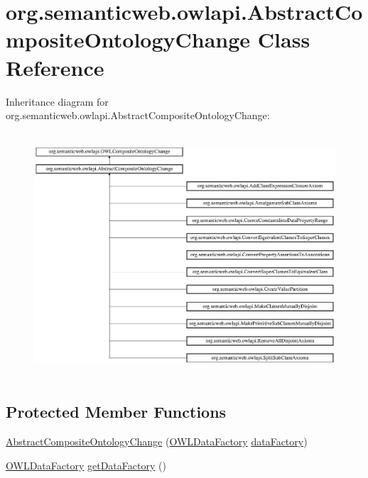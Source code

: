 \hypertarget{classorg_1_1semanticweb_1_1owlapi_1_1_abstract_composite_ontology_change}{\section{org.\-semanticweb.\-owlapi.\-Abstract\-Composite\-Ontology\-Change Class Reference}
\label{classorg_1_1semanticweb_1_1owlapi_1_1_abstract_composite_ontology_change}
}
Inheritance diagram for org.\-semanticweb.\-owlapi.\-Abstract\-Composite\-Ontology\-Change\-:\begin{figure}[H]
\begin{center}
\leavevmode
\includegraphics[height=9.145729cm]{classorg_1_1semanticweb_1_1owlapi_1_1_abstract_composite_ontology_change}
\end{center}
\end{figure}
\subsection*{Protected Member Functions}
\begin{DoxyCompactItemize}
\item 
\hyperlink{classorg_1_1semanticweb_1_1owlapi_1_1_abstract_composite_ontology_change_a63e35af2e74b9ea5c81f9c15b65a1c3b}{Abstract\-Composite\-Ontology\-Change} (\hyperlink{interfaceorg_1_1semanticweb_1_1owlapi_1_1model_1_1_o_w_l_data_factory}{O\-W\-L\-Data\-Factory} \hyperlink{classorg_1_1semanticweb_1_1owlapi_1_1_abstract_composite_ontology_change_aebcfd0601543ebb5f72b1fe53a5352c9}{data\-Factory})
\item 
\hyperlink{interfaceorg_1_1semanticweb_1_1owlapi_1_1model_1_1_o_w_l_data_factory}{O\-W\-L\-Data\-Factory} \hyperlink{classorg_1_1semanticweb_1_1owlapi_1_1_abstract_composite_ontology_change_a9198f46a61a6ed510868dcae74f3f1c3}{get\-Data\-Factory} ()
\end{DoxyCompactItemize}
